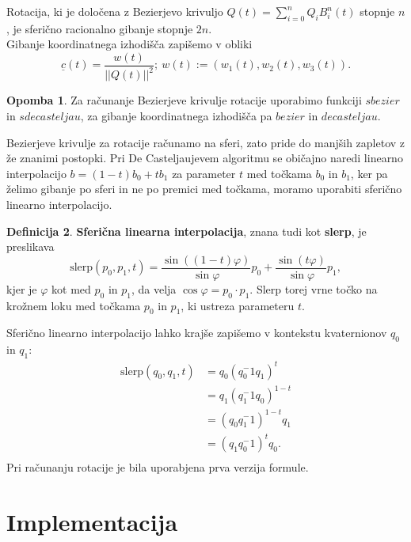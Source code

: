 \documentclass[12pt,a4paper,twoside]{article}
\theoremstyle{definition} %
\newtheorem{definicija}{Definicija}[section]
\newtheorem{opomba}[definicija]{Opomba}
\theoremstyle{plain} %
\numberwithin{equation}{section}  %
\begin{document}
\noindent Rotacija, ki je določena z Bezierjevo krivuljo $Q(t) = \sum\limits_{i=0}^{n} Q_i B_i^n(t)$ stopnje $n$, je sferično racionalno gibanje stopnje $2n$. \\

\noindent Gibanje koordinatnega izhodišča zapišemo v obliki
$$\underline{c}(t) = \frac{w(t)}{||Q(t)||^2};~ w(t) := (w_1(t), w_2(t),w_3(t)).$$

\begin{opomba}
Za računanje Bezierjeve krivulje rotacije uporabimo funkciji $sbezier$ in $sdecasteljau$, za gibanje koordinatnega izhodišča pa $bezier$ in $decasteljau$.
\end{opomba}

\noindent Bezierjeve krivulje za rotacije računamo na sferi, zato pride do manjših zapletov z že znanimi postopki. 
Pri De Casteljaujevem algoritmu se običajno naredi linearno interpolacijo $b = (1 - t) b_0 + t b_1$ za parameter $t$ med točkama $b_0$ in $b_1$,
ker pa želimo gibanje po sferi in ne po premici med točkama, moramo uporabiti sferično linearno interpolacijo.

\begin{definicija} \cite{slerping} {\bf Sferična linearna interpolacija}, znana tudi kot {\bf slerp}, je preslikava
    $$
        \text{slerp}(p_0, p_1, t) = \frac{\sin((1-t)\varphi)}{\sin \varphi} p_0 + \frac{\sin(t \varphi)}{\sin \varphi} p_1,
    $$
    kjer je $\varphi$ kot med $p_0$ in $p_1$, da velja $\cos \varphi = p_0 \cdot p_1$.
    Slerp torej vrne točko na krožnem loku med točkama $p_0$ in $p_1$, ki ustreza parameteru $t$.
\end{definicija}

\noindent Sferično linearno interpolacijo lahko krajše zapišemo v kontekstu kvaternionov $q_0$ in $q_1$:
\begin{align*}
    \text{slerp}(q_0, q_1, t) &= q_0 (q_0^-1 q_1)^t \\
    & = q_1 (q_1^-1 q_0)^{1-t}\\
    & = (q_0 q_1^-1)^{1-t}q_1 \\
    & = (q_1 q_0^-1)^t q_0. \\
\end{align*}
Pri računanju rotacije je bila uporabjena prva verzija formule.

\newpage

\section{Implementacija}
\end{document}
